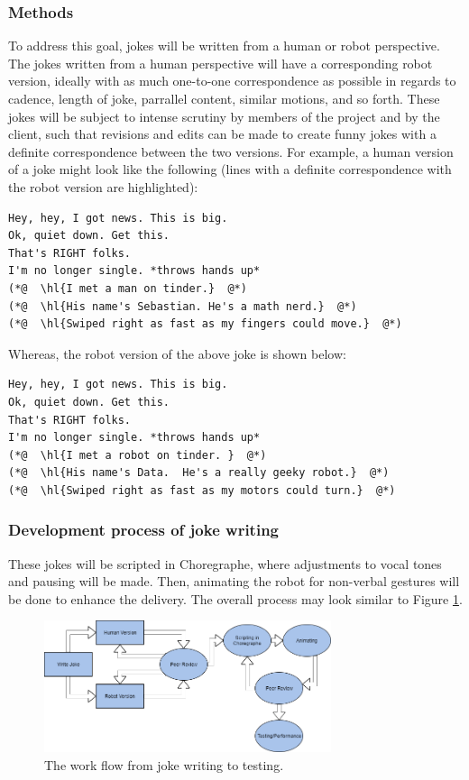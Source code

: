 \documentclass[onecolumn, draftclsnofoot,10pt, compsoc]{IEEEtran}
\begin{document}
\subsubsection{Methods}
To address this goal, jokes will be written from a human or robot perspective.
The jokes written from a human perspective will have a corresponding robot version, ideally with as much one-to-one correspondence as possible in regards to cadence, length of joke, parrallel content, similar motions, and so forth.
These jokes will be subject to intense scrutiny by members of the project and by the client, such that revisions and edits can be made to create funny jokes with a definite correspondence between the two versions.
For example, a human version of a joke might look like the following (lines with a definite correspondence with the robot version are highlighted):

\begin{lstlisting}
Hey, hey, I got news. This is big.
Ok, quiet down. Get this.
That's RIGHT folks.
I'm no longer single. *throws hands up*
(*@  \hl{I met a man on tinder.}  @*)
(*@  \hl{His name's Sebastian. He's a math nerd.}  @*)
(*@  \hl{Swiped right as fast as my fingers could move.}  @*)
\end{lstlisting}

Whereas, the robot version of the above joke is shown below:

\begin{lstlisting}
Hey, hey, I got news. This is big.
Ok, quiet down. Get this.
That's RIGHT folks.
I'm no longer single. *throws hands up*
(*@  \hl{I met a robot on tinder. }  @*)
(*@  \hl{His name's Data.  He's a really geeky robot.}  @*)
(*@  \hl{Swiped right as fast as my motors could turn.}  @*)
\end{lstlisting}

\subsubsection{Development process of joke writing}
These jokes will be scripted in Choregraphe, where adjustments to vocal tones and pausing will be made.
Then, animating the robot for non-verbal gestures will be done to enhance the delivery.
The overall process may look similar to Figure \ref{fig:write_process}.

\begin{figure}[H]
  \centering
  \includegraphics[width=0.75\textwidth,height=0.75\textheight,keepaspectratio]{joke_writing_process}
  \caption{The work flow from joke writing to testing.}
	\label{fig:write_process}
\end{figure}
\end{document}
